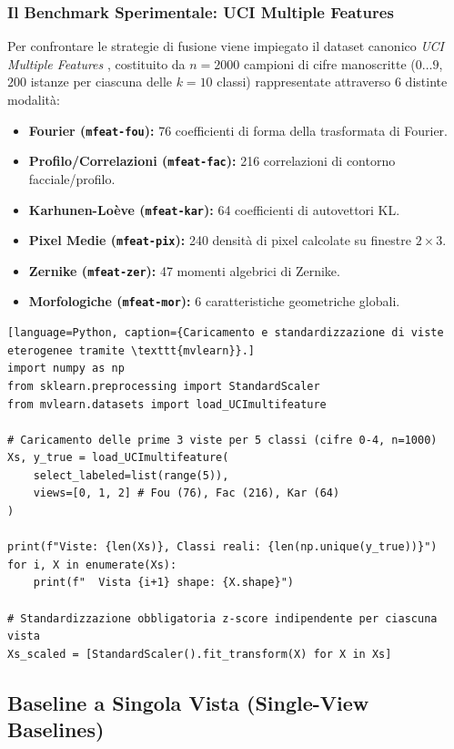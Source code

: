\subsubsection{Il Benchmark Sperimentale: UCI Multiple Features}
Per confrontare le strategie di fusione viene impiegato il dataset canonico \textit{UCI Multiple Features} \cite{perry2021}, costituito da $n = 2000$ campioni di cifre manoscritte ($0 \dots 9$, $200$ istanze per ciascuna delle $k=10$ classi) rappresentate attraverso 6 distinte modalità:
\begin{itemize}
    \item \textbf{Fourier (\texttt{mfeat-fou}):} 76 coefficienti di forma della trasformata di Fourier.
    \item \textbf{Profilo/Correlazioni (\texttt{mfeat-fac}):} 216 correlazioni di contorno facciale/profilo.
    \item \textbf{Karhunen-Lo{\`e}ve (\texttt{mfeat-kar}):} 64 coefficienti di autovettori KL.
    \item \textbf{Pixel Medie (\texttt{mfeat-pix}):} 240 densità di pixel calcolate su finestre $2 \times 3$.
    \item \textbf{Zernike (\texttt{mfeat-zer}):} 47 momenti algebrici di Zernike.
    \item \textbf{Morfologiche (\texttt{mfeat-mor}):} 6 caratteristiche geometriche globali.
\end{itemize}

\begin{lstlisting}[language=Python, caption={Caricamento e standardizzazione di viste eterogenee tramite \texttt{mvlearn}}.]
import numpy as np
from sklearn.preprocessing import StandardScaler
from mvlearn.datasets import load_UCImultifeature

# Caricamento delle prime 3 viste per 5 classi (cifre 0-4, n=1000)
Xs, y_true = load_UCImultifeature(
    select_labeled=list(range(5)),
    views=[0, 1, 2] # Fou (76), Fac (216), Kar (64)
)

print(f"Viste: {len(Xs)}, Classi reali: {len(np.unique(y_true))}")
for i, X in enumerate(Xs):
    print(f"  Vista {i+1} shape: {X.shape}")

# Standardizzazione obbligatoria z-score indipendente per ciascuna vista
Xs_scaled = [StandardScaler().fit_transform(X) for X in Xs]
\end{lstlisting}

\FloatBarrier
\subsection{Baseline a Singola Vista (Single-View Baselines)}
\label{subsec:lab-single-view}

